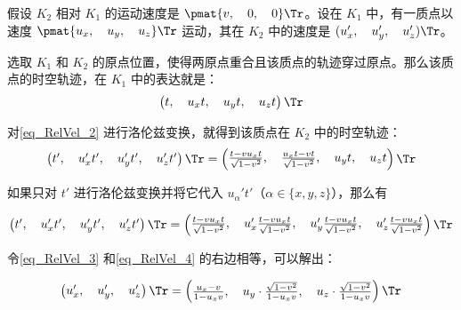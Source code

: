 假设 $K_2$ 相对 $K_1$ 的运动速度是 $\pmat{v,\quad 0,\quad 0}\Tr$。设在 $K_1$ 中，有一质点以速度 $\pmat{u_x,\quad u_y,\quad u_z}\Tr$ 运动，其在 $K_2$ 中的速度是 $(u_x',\quad u_y',\quad u_z')\Tr$。

选取 $K_1$ 和 $K_2$ 的原点位置，使得两原点重合且该质点的轨迹穿过原点。那么该质点的时空轨迹，在 $K_1$ 中的表达就是：
\begin{equation}\label{eq_RelVel_2}
\left(\begin{matrix}t,\quad u_xt,\quad u_yt,\quad u_zt\end{matrix} \right)\Tr 
\end{equation}

对\autoref{eq_RelVel_2} 进行洛伦兹变换，就得到该质点在 $K_2$ 中的时空轨迹：
\begin{equation}\label{eq_RelVel_3}
\left(\begin{matrix}t',\quad u_x't',\quad u_y't',\quad u_z't'\end{matrix} \right)\Tr 
= 
\left(\begin{matrix}\frac{t-vu_xt}{\sqrt{1-v^2}},\quad\frac{u_xt-vt}{\sqrt{1-v^2}},\quad u_yt,\quad u_zt\end{matrix} \right)\Tr 
\end{equation}

如果只对 $t'$ 进行洛伦兹变换并将它代入 $u_\alpha't'$（$\alpha\in\{x, y, z\}$），那么有

\begin{equation}\label{eq_RelVel_4}
\left(\begin{matrix}t',\quad u_x't',\quad u_y't',\quad u_z't'\end{matrix} \right)\Tr 
= 
\left(\begin{matrix}\frac{t-vu_xt}{\sqrt{1-v^2}},\quad u_x'\frac{t-vu_xt}{\sqrt{1-v^2}},\quad u_y'\frac{t-vu_xt}{\sqrt{1-v^2}},\quad u_z'\frac{t-vu_xt}{\sqrt{1-v^2}}\end{matrix} \right)\Tr 
\end{equation}

令\autoref{eq_RelVel_3} 和\autoref{eq_RelVel_4} 的右边相等，可以解出：

\begin{equation}
\left(\begin{matrix}u_x',\quad u_y',\quad u_z'\end{matrix} \right)\Tr 
= 
\left(\begin{matrix}\frac{u_x-v}{1-u_xv},\quad u_y\cdot\frac{\sqrt{1-v^2}}{1-u_xv},\quad u_z\cdot\frac{\sqrt{1-v^2}}{1-u_xv}\end{matrix} \right)\Tr 
\end{equation}

